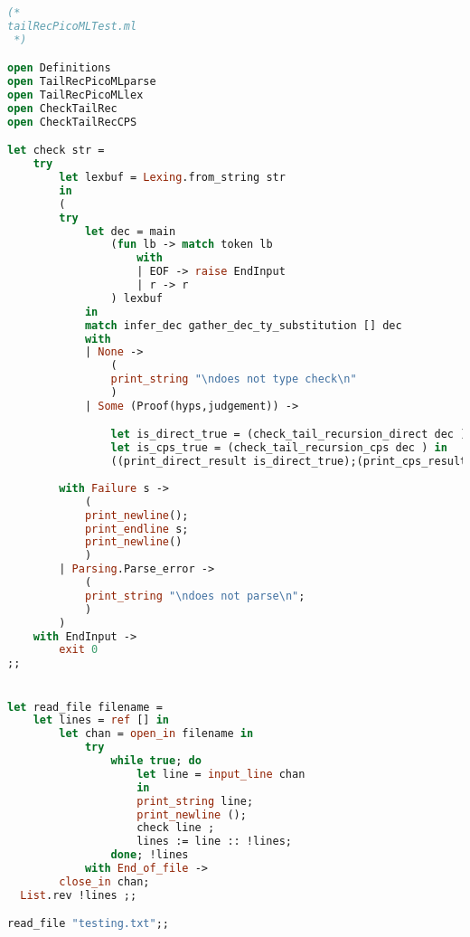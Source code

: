 \begin{lstlisting}[language=Caml, caption=tailRecPicoMLTest.ml]
(*
tailRecPicoMLTest.ml
 *)

open Definitions
open TailRecPicoMLparse
open TailRecPicoMLlex
open CheckTailRec
open CheckTailRecCPS

let check str =
    try
        let lexbuf = Lexing.from_string str
        in 
        (
        try
            let dec = main 
                (fun lb -> match token lb 
                    with 
                    | EOF -> raise EndInput
                    | r -> r
                ) lexbuf 
            in 
            match infer_dec gather_dec_ty_substitution [] dec 
            with 
            | None -> 
                (
                print_string "\ndoes not type check\n"
                )
            | Some (Proof(hyps,judgement)) ->

                let is_direct_true = (check_tail_recursion_direct dec ) in 
                let is_cps_true = (check_tail_recursion_cps dec ) in 
                ((print_direct_result is_direct_true);(print_cps_result is_cps_true);(print_match is_direct_true is_cps_true))
                
        with Failure s -> 
            (
            print_newline();
            print_endline s;
            print_newline()
            )
        | Parsing.Parse_error ->
            (
            print_string "\ndoes not parse\n";
            )
        )
    with EndInput -> 
        exit 0
;;


let read_file filename = 
    let lines = ref [] in
        let chan = open_in filename in
            try
                while true; do
                    let line = input_line chan
                    in
                    print_string line;
                    print_newline (); 
                    check line ;
                    lines := line :: !lines;
                done; !lines
            with End_of_file ->
        close_in chan;
  List.rev !lines ;;

read_file "testing.txt";;
\end{lstlisting}
